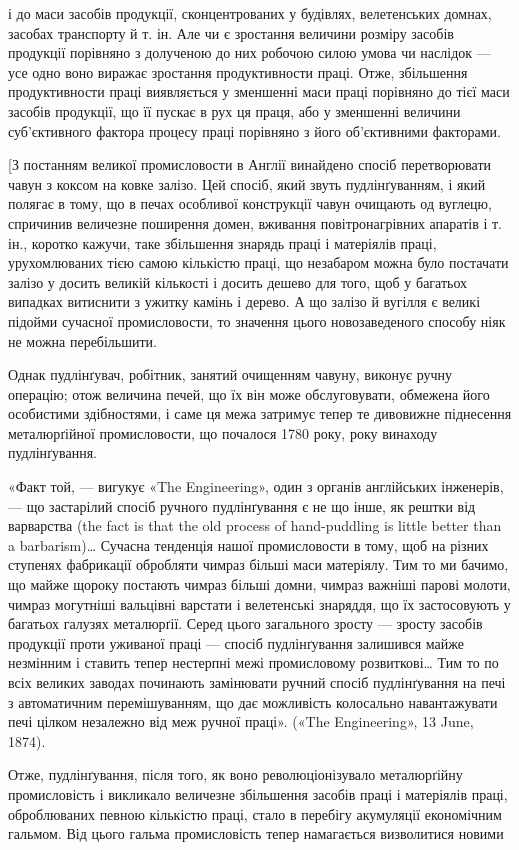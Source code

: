 \parcont{}  %
і до маси засобів продукції, сконцентрованих у будівлях, велетенських
домнах, засобах транспорту й т. ін. Але чи є зростання
величини розміру засобів продукції порівняно з долученою до
них робочою силою умова чи наслідок — усе одно воно виражає
зростання продуктивности праці. Отже, збільшення продуктивности
праці виявляється у зменшенні маси праці порівняно до
тієї маси засобів продукції, що її пускає в рух ця праця, або у
зменшенні величини суб’єктивного фактора процесу праці порівняно
з його об’єктивними факторами.

[З постанням великої промисловости в Англії винайдено
спосіб перетворювати чавун з коксом на ковке залізо. Цей
спосіб, який звуть пудлінґуванням, і який полягає в тому, що
в печах особливої конструкції чавун очищають од вуглецю,
спричинив величезне поширення домен, вживання повітронагрівних
апаратів і т. ін., коротко кажучи, таке збільшення знарядь
праці і матеріялів праці, урухомлюваних тією самою кількістю
праці, що незабаром можна було постачати залізо у досить великій
кількості і досить дешево для того, щоб у багатьох випадках
витиснити з ужитку камінь і дерево. А що залізо й вугілля є
великі підойми сучасної промисловости, то значення цього новозаведеного
способу ніяк не можна перебільшити.

Однак пудлінґувач, робітник, занятий очищенням чавуну,
виконує ручну операцію; отож величина печей, що їх він може
обслуговувати, обмежена його особистими здібностями, і саме
ця межа затримує тепер те дивовижне піднесення металюрґійної
промисловости, що почалося 1780 року, року винаходу пудлінґування.

«Факт той, — вигукує «The Engineering», один з органів
англійських інженерів, — що застарілий спосіб ручного пудлінґування
є не що інше, як рештки від варварства (the fact is that the old
process of hand-puddling is little better than a barbarism)\dots{}
Сучасна тенденція нашої промисловости в тому, щоб на різних
ступенях фабрикації обробляти чимраз більші маси матеріялу.
Тим то ми бачимо, що майже щороку постають чимраз
більші домни, чимраз важніші парові молоти, чимраз могутніші
вальцівні варстати і велетенські знаряддя, що їх застосовують
у багатьох галузях металюрґії. Серед цього загального зросту —
зросту засобів продукції проти уживаної праці — спосіб пудлінґування
залишився майже незмінним і ставить тепер нестерпні
межі промисловому розвиткові\dots{} Тим то по всіх великих заводах
починають замінювати ручний спосіб пудлінґування на
печі з автоматичним перемішуванням, що дає можливість колосально
навантажувати печі цілком незалежно від меж ручної
праці». («The Engineering», 13 June, 1874).

Отже, пудлінґування, після того, як воно революціонізувало
металюрґійну промисловість і викликало величезне збільшення
засобів праці і матеріялів праці, оброблюваних певною кількістю
праці, стало в перебігу акумуляції економічним гальмом. Від
цього гальма промисловість тепер намагається визволитися новими
\parbreak{}  %
